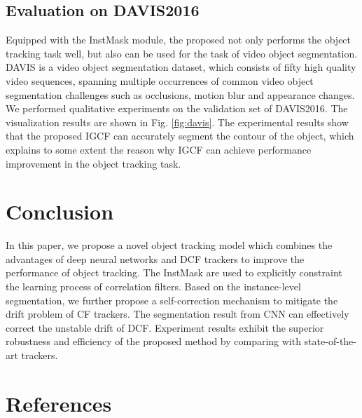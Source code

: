 \documentclass[review]{elsarticle}
\begin{document}
\begin{CJK*}{UTF8}{gbsn}
\subsection{Evaluation on DAVIS2016}
Equipped with the InstMask module, the proposed not only performs the object tracking task well, but also can be used for the task of video object segmentation. DAVIS \cite{Perazzi2016} is a video object segmentation dataset, which consists of fifty high quality video sequences, spanning multiple occurrences of common video  object segmentation challenges such as occlusions, motion blur and appearance changes. We performed qualitative experiments on the validation set of DAVIS2016. The visualization results are shown in Fig. \ref{fig:davis}. The experimental results show that the proposed IGCF can accurately segment the contour of the object, which explains to some extent the reason why IGCF can achieve performance improvement in the object tracking task.

\section{Conclusion}
In this paper, we propose a novel object tracking model which combines the advantages of deep neural networks and DCF trackers to improve the performance of object tracking.
The InstMask are used to explicitly constraint the learning process of correlation filters. Based on the instance-level segmentation, we further propose a self-correction mechanism to mitigate the drift problem of CF trackers.
The segmentation result from CNN can effectively correct the unstable drift of DCF.
Experiment results exhibit the superior robustness and efficiency of the proposed method by comparing with state-of-the-art trackers.

\end{CJK*}

\section*{References}


\end{document}
